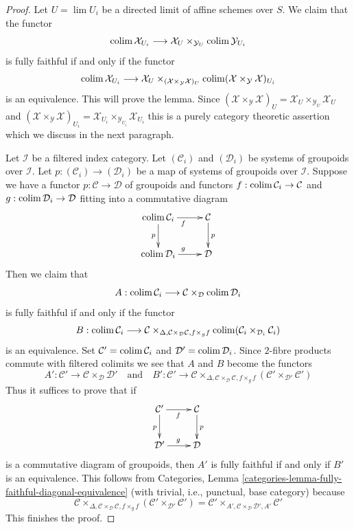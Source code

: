 \begin{proof}
Let $U = \lim U_i$ be a directed limit of affine schemes over $S$.
We claim that the functor
$$
\mathop{\mathrm{colim}}\nolimits \mathcal{X}_{U_i} \longrightarrow
\mathcal{X}_U \times_{\mathcal{Y}_U} \mathop{\mathrm{colim}}\nolimits \mathcal{Y}_{U_i}
$$
is fully faithful if and only if the functor
$$
\mathop{\mathrm{colim}}\nolimits \mathcal{X}_{U_i} \longrightarrow
\mathcal{X}_U \times_{(\mathcal{X} \times_\mathcal{Y} \mathcal{X})_U}
\mathop{\mathrm{colim}}\nolimits (\mathcal{X} \times_\mathcal{Y} \mathcal{X})_{U_i}
$$
is an equivalence. This will prove the lemma.
Since
$(\mathcal{X} \times_\mathcal{Y} \mathcal{X})_U =
\mathcal{X}_U \times_{\mathcal{Y}_U} \mathcal{X}_U$
and
$(\mathcal{X} \times_\mathcal{Y} \mathcal{X})_{U_i} =
\mathcal{X}_{U_i} \times_{\mathcal{Y}_{U_i}} \mathcal{X}_{U_i}$
this is a purely category theoretic assertion which we discuss
in the next paragraph.

\medskip\noindent
Let $\mathcal{I}$ be a filtered index category.
Let $(\mathcal{C}_i)$ and $(\mathcal{D}_i)$ be systems
of groupoids over $\mathcal{I}$.
Let $p : (\mathcal{C}_i) \to (\mathcal{D}_i)$ be a map
of systems of groupoids over $\mathcal{I}$.
Suppose we have a functor $p : \mathcal{C} \to \mathcal{D}$
of groupoids and functors
$f : \mathop{\mathrm{colim}}\nolimits \mathcal{C}_i \to \mathcal{C}$ and
$g : \mathop{\mathrm{colim}}\nolimits \mathcal{D}_i \to \mathcal{D}$
fitting into a commutative diagram
$$
\xymatrix{
\colim \mathcal{C}_i \ar[d]_p \ar[r]_f & \mathcal{C} \ar[d]^p \\
\colim \mathcal{D}_i \ar[r]^g & \mathcal{D}
}
$$
Then we claim that
$$
A : \mathop{\mathrm{colim}}\nolimits \mathcal{C}_i \longrightarrow
\mathcal{C} \times_\mathcal{D} \mathop{\mathrm{colim}}\nolimits \mathcal{D}_i
$$
is fully faithful if and only if the functor
$$
B : \mathop{\mathrm{colim}}\nolimits \mathcal{C}_i \longrightarrow
\mathcal{C}
\times_{\Delta, \mathcal{C} \times_\mathcal{D} \mathcal{C}, f \times_g f}
\mathop{\mathrm{colim}}\nolimits (\mathcal{C}_i \times_{\mathcal{D}_i} \mathcal{C}_i)
$$
is an equivalence. Set $\mathcal{C}' = \mathop{\mathrm{colim}}\nolimits \mathcal{C}_i$ and
$\mathcal{D}' = \mathop{\mathrm{colim}}\nolimits \mathcal{D}_i$.
Since $2$-fibre products commute with filtered colimits we see that
$A$ and $B$ become the functors
$$
A' : \mathcal{C}' \to \mathcal{C} \times_\mathcal{D} \mathcal{D}'
\quad\text{and}\quad
B' : \mathcal{C}' \longrightarrow
\mathcal{C}
\times_{\Delta, \mathcal{C} \times_\mathcal{D} \mathcal{C}, f \times_g f}
(\mathcal{C}' \times_{\mathcal{D}'} \mathcal{C}')
$$
Thus it suffices to prove that if
$$
\xymatrix{
\mathcal{C}' \ar[d]_p \ar[r]_f & \mathcal{C} \ar[d]^p \\
\mathcal{D}' \ar[r]^g & \mathcal{D}
}
$$
is a commutative diagram of groupoids, then $A'$ is fully faithful
if and only if $B'$ is an equivalence. This follows from
Categories, Lemma \ref{categories-lemma-fully-faithful-diagonal-equivalence}
(with trivial, i.e., punctual, base category) because
$$
\mathcal{C}
\times_{\Delta, \mathcal{C} \times_\mathcal{D} \mathcal{C}, f \times_g f}
(\mathcal{C}' \times_{\mathcal{D}'} \mathcal{C}') =
\mathcal{C}'
\times_{A', \mathcal{C} \times_\mathcal{D} \mathcal{D}', A'}
\mathcal{C}'
$$
This finishes the proof.
\end{proof}

